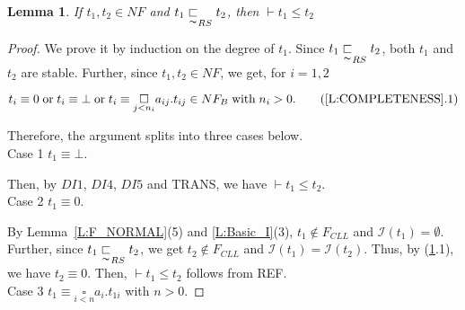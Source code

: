 \documentclass{elsarticle}
\theoremstyle{plain}
\newtheorem{lemma}[theorem]{Lemma}
\theoremstyle{definition}
\begin{document}
\begin{lemma}\label{L:COMPLETENESS}
  If $t_1,t_2 \in NF$ and $t_1 \underset{\thicksim}{\sqsubset}_{RS} t_2$, then $\vdash  t_1 \leqslant t_2$
\end{lemma}
\begin{proof}
    We prove it by induction on the degree of $t_1$.
    Since $t_1 \underset{\thicksim}{\sqsubset}_{RS} t_2$, both $t_1$ and $t_2$ are stable. Further, since $t_1,t_2\in NF$, we get, for $i=1,2$

    \[t_i \equiv 0\;\text{or}\; t_i \equiv \bot\;\text{or}\; t_i \equiv \underset{j<n_i}{\square}a_{ij}.t_{ij}\in NF_B\;\text{with}\; n_i>0.  \tag{\ref{L:COMPLETENESS}.1}\]

    Therefore, the argument splits into three cases below.\\

\noindent Case 1 $t_1 \equiv \bot$.

        Then, by $DI1$, $DI4$, $DI5$ and TRANS, we have $\vdash  t_1 \leqslant t_2$.\\

\noindent Case 2 $t_1 \equiv 0$.

       By Lemma~\ref{L:F_NORMAL}(5) and \ref{L:Basic_I}(3), $t_1 \notin F_{{CLL}}$ and ${\mathcal I}(t_1)=\emptyset$. Further, since $t_1 \underset{\thicksim}{\sqsubset}_{RS} t_2$, we get $t_2 \notin F_{{CLL}}$ and ${\mathcal I}(t_1)={\mathcal I}(t_2)$. Thus, by (\ref{L:COMPLETENESS}.1), we have $t_2 \equiv 0$. Then, $\vdash  t_1 \leqslant t_2$ follows from REF.\\

\noindent Case 3 $t_1 \equiv \underset{i< n}{\square}a_i.t_{1i} $ with $n>0$.


\end{proof}
\end{document}
